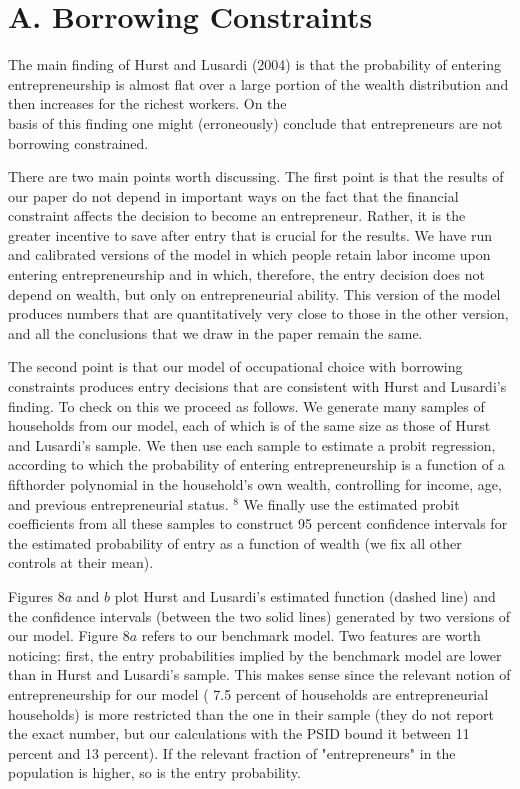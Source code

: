 \documentclass[10pt]{article}
\begin{document}
\section*{A. Borrowing Constraints}
The main finding of Hurst and Lusardi (2004) is that the probability of entering entrepreneurship is almost flat over a large portion of the wealth distribution and then increases for the richest workers. On the\\
basis of this finding one might (erroneously) conclude that entrepreneurs are not borrowing constrained.

There are two main points worth discussing. The first point is that the results of our paper do not depend in important ways on the fact that the financial constraint affects the decision to become an entrepreneur. Rather, it is the greater incentive to save after entry that is crucial for the results. We have run and calibrated versions of the model in which people retain labor income upon entering entrepreneurship and in which, therefore, the entry decision does not depend on wealth, but only on entrepreneurial ability. This version of the model produces numbers that are quantitatively very close to those in the other version, and all the conclusions that we draw in the paper remain the same.

The second point is that our model of occupational choice with borrowing constraints produces entry decisions that are consistent with Hurst and Lusardi's finding. To check on this we proceed as follows. We generate many samples of households from our model, each of which is of the same size as those of Hurst and Lusardi's sample. We then use each sample to estimate a probit regression, according to which the probability of entering entrepreneurship is a function of a fifthorder polynomial in the household's own wealth, controlling for income, age, and previous entrepreneurial status. ${ }^{8}$ We finally use the estimated probit coefficients from all these samples to construct 95 percent confidence intervals for the estimated probability of entry as a function of wealth (we fix all other controls at their mean).

Figures $8 a$ and $b$ plot Hurst and Lusardi's estimated function (dashed line) and the confidence intervals (between the two solid lines) generated by two versions of our model. Figure $8 a$ refers to our benchmark model. Two features are worth noticing: first, the entry probabilities implied by the benchmark model are lower than in Hurst and Lusardi's sample. This makes sense since the relevant notion of entrepreneurship for our model ( 7.5 percent of households are entrepreneurial households) is more restricted than the one in their sample (they do not report the exact number, but our calculations with the PSID bound it between 11 percent and 13 percent). If the relevant fraction of "entrepreneurs" in the population is higher, so is the entry probability.
\end{document}
